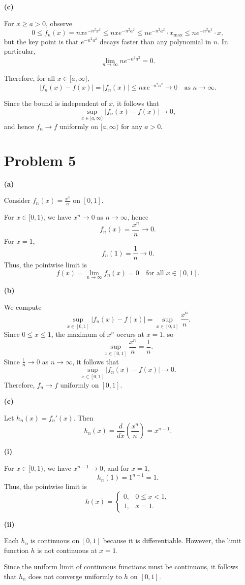 \documentclass[12pt]{article}
\begin{document}
\bigskip

\textbf{(c)}

For $x \ge a > 0$, observe
\[
0 \le f_n(x) = n x e^{-n^2 x^2} \le n x e^{-n^2 a^2} \le n e^{-n^2 a^2} \cdot x_{\max} \le n e^{-n^2 a^2} \cdot x,
\]
but the key point is that $e^{-n^2 a^2}$ decays faster than any polynomial in $n$. In particular,
\[
\lim_{n \to \infty} n e^{-n^2 a^2} = 0.
\]

Therefore, for all $x \in [a,\infty)$,
\[
|f_n(x) - f(x)| = |f_n(x)| \le n x e^{-n^2 a^2} \to 0 \quad \text{as } n \to \infty.
\]

Since the bound is independent of $x$, it follows that
\[
\sup_{x \in [a,\infty)} |f_n(x) - f(x)| \to 0,
\]
and hence $f_n \to f$ uniformly on $[a,\infty)$ for any $a > 0$.

\section*{Problem 5}
\textbf{(a)} 

Consider $f_n(x) = \frac{x^n}{n}$ on $[0,1]$.

For $x \in [0,1)$, we have $x^n \to 0$ as $n \to \infty$, hence
\[
f_n(x) = \frac{x^n}{n} \to 0.
\]
For $x = 1$,
\[
f_n(1) = \frac{1}{n} \to 0.
\]
Thus, the pointwise limit is
\[
f(x) = \lim_{n \to \infty} f_n(x) = 0 \quad \text{for all } x \in [0,1].
\]

\bigskip

\textbf{(b)} 

We compute
\[
\sup_{x \in [0,1]} |f_n(x) - f(x)| 
= \sup_{x \in [0,1]} \frac{x^n}{n}.
\]
Since $0 \le x \le 1$, the maximum of $x^n$ occurs at $x=1$, so
\[
\sup_{x \in [0,1]} \frac{x^n}{n} = \frac{1}{n}.
\]
Since $\frac{1}{n} \to 0$ as $n \to \infty$, it follows that
\[
\sup_{x \in [0,1]} |f_n(x) - f(x)| \to 0.
\]
Therefore, $f_n \to f$ uniformly on $[0,1]$.

\bigskip

\textbf{(c)} 

Let $h_n(x) = f_n'(x)$. Then
\[
h_n(x) = \frac{d}{dx}\left(\frac{x^n}{n}\right) = x^{n-1}.
\]

\medskip

\textbf{(i)} 

For $x \in [0,1)$, we have $x^{n-1} \to 0$, and for $x=1$,
\[
h_n(1) = 1^{n-1} = 1.
\]
Thus, the pointwise limit is
\[
h(x) =
\begin{cases}
0, & 0 \le x < 1, \\
1, & x = 1.
\end{cases}
\]

\medskip

\textbf{(ii)} 

Each $h_n$ is continuous on $[0,1]$ because it is differentiable. However, the limit function $h$ is not continuous at $x=1$.

Since the uniform limit of continuous functions must be continuous, it follows that $h_n$ does not converge uniformly to $h$ on $[0,1]$.
\end{document}
